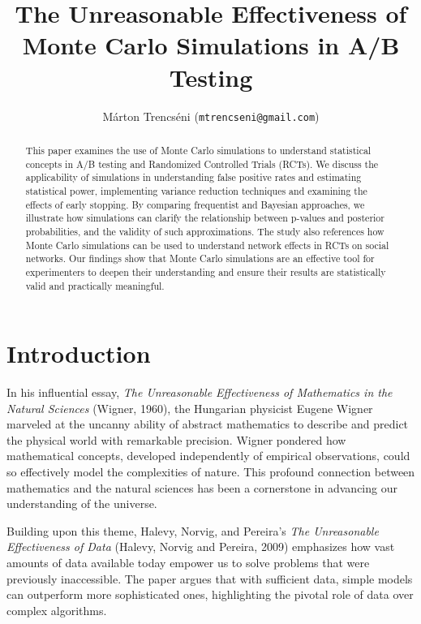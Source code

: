 \documentclass[final,5p,times,twocolumn,authoryear]{elsarticle}
\begin{document}
\begin{frontmatter}

\title{The Unreasonable Effectiveness of Monte Carlo Simulations in A/B Testing}

\author{Márton Trencséni (\texttt{mtrencseni@gmail.com})}

\begin{abstract}
This paper examines the use of Monte Carlo simulations to understand statistical concepts in A/B testing and Randomized Controlled Trials (RCTs). We discuss the applicability of simulations in understanding false positive rates and estimating statistical power, implementing variance reduction techniques and examining the effects of early stopping. By comparing frequentist and Bayesian approaches, we illustrate how simulations can clarify the relationship between p-values and posterior probabilities, and the validity of such approximations. The study also references how Monte Carlo simulations can be used to understand network effects in RCTs on social networks. Our findings show that Monte Carlo simulations are an effective tool for experimenters to deepen their understanding and ensure their results are statistically valid and practically meaningful.

\end{abstract}

\end{frontmatter}

\section{Introduction}

In his influential essay, \textit{The Unreasonable Effectiveness of Mathematics in the Natural Sciences} (Wigner, 1960), the Hungarian physicist Eugene Wigner marveled at the uncanny ability of abstract mathematics to describe and predict the physical world with remarkable precision. Wigner pondered how mathematical concepts, developed independently of empirical observations, could so effectively model the complexities of nature. This profound connection between mathematics and the natural sciences has been a cornerstone in advancing our understanding of the universe.

Building upon this theme, Halevy, Norvig, and Pereira's \textit{The Unreasonable Effectiveness of Data} (Halevy, Norvig and Pereira, 2009) emphasizes how vast amounts of data available today empower us to solve problems that were previously inaccessible. The paper argues that with sufficient data, simple models can outperform more sophisticated ones, highlighting the pivotal role of data over complex algorithms.
\end{document}
